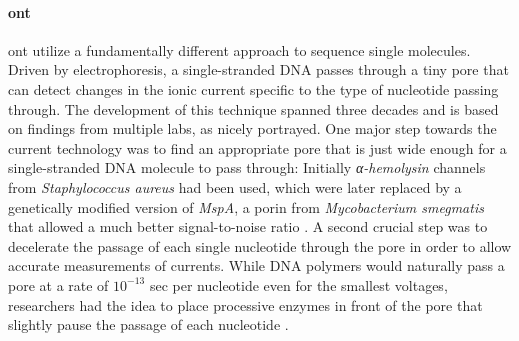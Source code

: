 

\paragraph{\acl{ont}}
\Acl{ont} utilize a fundamentally different approach to sequence single
molecules. Driven by electrophoresis, a single-stranded DNA passes through a
tiny pore that can detect changes in the ionic current specific to the type of
nucleotide passing through. The development of this technique spanned three
decades and is based on findings from multiple labs, as \citet{Deamer2016}
nicely portrayed. One major step towards the current technology was to find an
appropriate pore that is just wide enough for a single-stranded DNA molecule to
pass through: Initially \textit{α-hemolysin} channels from
\textit{Staphylococcus aureus} had been used, which were later replaced by a
genetically modified version of \textit{MspA}, a porin from
\textit{Mycobacterium smegmatis} that allowed a much better signal-to-noise
ratio \citep{Butler2008}. A second crucial step was to decelerate the passage of
each single nucleotide through the pore in order to allow accurate measurements
of currents. While DNA polymers would naturally pass a pore at a rate of $10^{-13}$ sec
per nucleotide even for the smallest voltages, researchers had the idea to place
processive enzymes in front of the pore that slightly pause the passage of each
nucleotide \citep{Deamer2016}.

